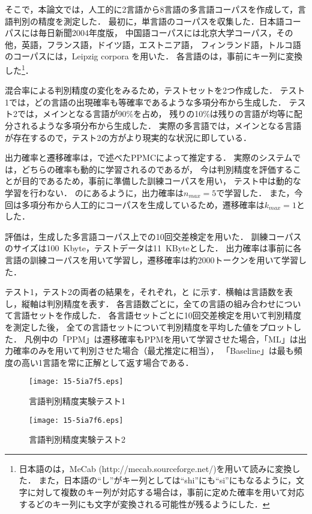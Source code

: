 \documentclass[japanese]{jnlp_1.4}
\newcommand{\secref}[1]{}
\newcommand{\figref}[1]{}
\renewcommand{\eqref}[1]{}
\renewcommand{\text}{}
\begin{document}
そこで，本論文では，人工的に2言語から8言語の多言語コーパスを作成して，言語判別の精度を測定した．
最初に，単言語のコーパスを収集した．日本語コーパスには毎日新聞2004年度版，
中国語コーパスには北京大学コーパス，その他，英語，フランス語，ドイツ語，エストニア語，
フィンランド語，トルコ語のコーパスには，Leipzig corpora \cite{leipzigproceeding3}を用いた．
各言語の{\text}は，事前にキー列に変換した\footnote{日本語の{\text}は，MeCab (http://mecab.sourceforge.net/)を用いて読みに変換した．
また，日本語の``し''がキー列としては``shi''にも``si''にもなるように，文字に対して複数のキー列が対応する場合は，事前に定めた確率を用いて対応するどのキー列にも文字が変換される可能性が残るようにした．}．

混合率による判別精度の変化をみるため，テストセットを2つ作成した．
テスト1では，どの言語の出現確率も等確率であるような多項分布から生成した．
テスト2では，メインとなる言語が90\%を占め，
残りの10\%は残りの言語が均等に配分されるような多項分布から生成した．
実際の多言語{\text}では，メインとなる言語が存在するので，テスト2の方がより現実的な状況に即している．

出力確率と遷移確率は，\secref{sec:model}で述べたPPMCによって推定する．
実際のシステムでは，どちらの確率も動的に学習されるのであるが，
今は判別精度を評価することが目的であるため，事前に準備した訓練コーパスを用い，
テスト中は動的な学習を行わない．
\secref{sec:output}の\eqref{eq:ppm}にあるように，出力確率は$n_{max}=5$で学習した．
また，今回は多項分布から人工的にコーパスを生成しているため，遷移確率は$k_{max}=1$とした．

評価は，生成した多言語コーパス上での10回交差検定を用いた．
訓練コーパスのサイズは100~Kbyte，テストデータは11~KByteとした．
出力確率は事前に各言語の訓練コーパスを用いて学習し，遷移確率は約2000トークンを用いて学習した．

テスト1，テスト2の両者の結果を，それぞれ，\figref{fig:graphtest1}と\figref{fig:graphtest2}
に示す．横軸は言語数を表し，縦軸は判別精度を表す．
各言語数ごとに，全ての言語の組み合わせについて言語セットを作成した．
各言語セットごとに10回交差検定を用いて判別精度を測定した後，
全ての言語セットについて判別精度を平均した値をプロットした．
凡例中の「PPM」は遷移確率もPPMを用いて学習させた場合，「ML」は出力確率のみを用いて判別させた場合（最尤推定に相当），
「Baseline」は最も頻度の高い1言語を常に正解として返す場合である．

\begin{figure}[b] 
\begin{minipage}{0.5\linewidth} 
  \begin{center} 
\texttt{[image: 15-5ia7f5.eps]}
  \caption{言語判別精度実験テスト1}
        \label{fig:graphtest1}
      \end{center} 
\end{minipage}
 \begin{minipage}{0.5\linewidth} 
  \begin{center}
\texttt{[image: 15-5ia7f6.eps]}
    \caption{言語判別精度実験テスト2}
        \label{fig:graphtest2}
  \end{center} 
\end{minipage}
\end{figure}
\end{document}
